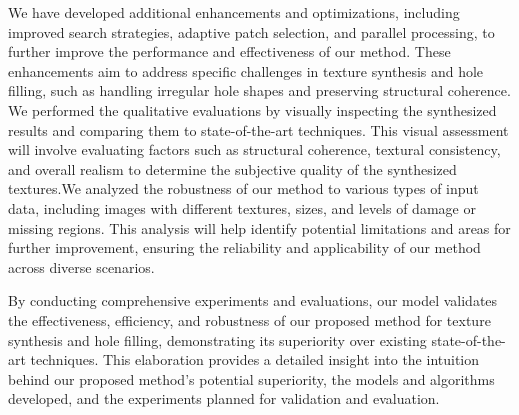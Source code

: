 \begin{methods}
We have developed additional enhancements and optimizations, including improved search strategies, adaptive patch selection, and parallel processing, to further improve the performance and effectiveness of our method. These enhancements aim to address specific challenges in texture synthesis and hole filling, such as handling irregular hole shapes and preserving structural coherence. We performed the qualitative evaluations by visually inspecting the synthesized results and comparing them to state-of-the-art techniques. This visual assessment will involve evaluating factors such as structural coherence, textural consistency, and overall realism to determine the subjective quality of the synthesized textures.We analyzed the robustness of our method to various types of input data, including images with different textures, sizes, and levels of damage or missing regions. This analysis will help identify potential limitations and areas for further improvement, ensuring the reliability and applicability of our method across diverse scenarios.

By conducting comprehensive experiments and evaluations, our model validates the effectiveness, efficiency, and robustness of our proposed method for texture synthesis and hole filling, demonstrating its superiority over existing state-of-the-art techniques. This elaboration provides a detailed insight into the intuition behind our proposed method's potential superiority, the models and algorithms developed, and the experiments planned for validation and evaluation.


\end{methods}